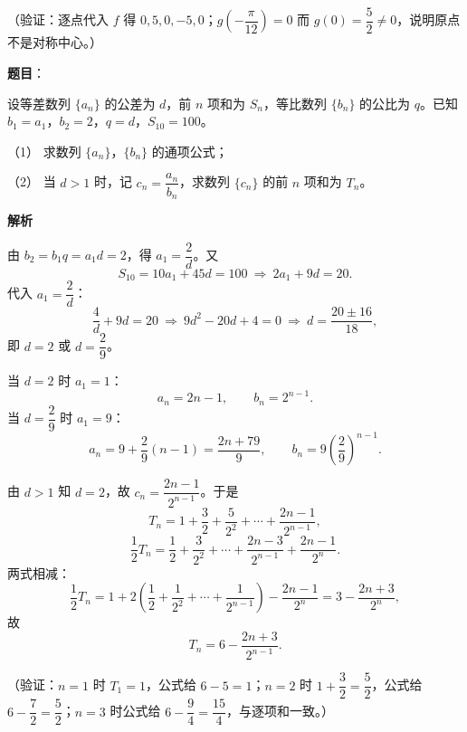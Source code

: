 \begin{answer}
（验证：逐点代入 \(f\) 得 \(0,5,0,-5,0\)；\(g\left(-\dfrac{\pi}{12}\right)=0\) 而 \(g(0)=\dfrac52\neq0\)，说明原点不是对称中心。）



\end{answer}
\begin{answer}

\textbf{题目}：

设等差数列 \(\{a_n\}\) 的公差为 \(d\)，前 \(n\) 项和为 \(S_n\)，等比数列 \(\{b_n\}\) 的公比为 \(q\)。已知 \(b_1=a_1\)，\(b_2=2\)，\(q=d\)，\(S_{10}=100\)。

（1） 求数列 \(\{a_n\}\)，\(\{b_n\}\) 的通项公式；

（2） 当 \(d>1\) 时，记 \(c_n=\dfrac{a_n}{b_n}\)，求数列 \(\{c_n\}\) 的前 \(n\) 项和为 \(T_n\)。

\textbf{解析}


由 \(b_2=b_1q=a_1d=2\)，得 \(a_1=\dfrac2d\)。又
\nopagebreak[4]
\[
S_{10}=10a_1+45d=100
\ \Longrightarrow\ 2a_1+9d=20.
\]
代入 \(a_1=\dfrac2d\)：
\nopagebreak[4]
\[
\frac4d+9d=20
\ \Longrightarrow\ 9d^2-20d+4=0
\ \Longrightarrow\ d=\frac{20\pm16}{18},
\]
即 \(d=2\) 或 \(d=\dfrac29\)。

当 \(d=2\) 时 \(a_1=1\)：
\nopagebreak[4]
\[
a_n=2n-1,\qquad b_n=2^{n-1}.
\]
当 \(d=\dfrac29\) 时 \(a_1=9\)：
\nopagebreak[4]
\[
a_n=9+\frac29(n-1)=\frac{2n+79}{9},\qquad
b_n=9\left(\frac29\right)^{n-1}.
\]


由 \(d>1\) 知 \(d=2\)，故 \(c_n=\dfrac{2n-1}{2^{n-1}}\)。于是
\nopagebreak[4]
\[
T_n=1+\frac3{2}+\frac5{2^2}+\cdots+\frac{2n-1}{2^{n-1}},
\]
\nopagebreak[4]
\[
\frac12T_n=\frac12+\frac3{2^2}+\cdots+\frac{2n-3}{2^{n-1}}+\frac{2n-1}{2^n}.
\]
两式相减：
\nopagebreak[4]
\[
\frac12T_n=1+2\left(\frac12+\frac1{2^2}+\cdots+\frac1{2^{n-1}}\right)-\frac{2n-1}{2^n}
=3-\frac{2n+3}{2^n},
\]
故
\nopagebreak[4]
\[
T_n=6-\frac{2n+3}{2^{n-1}}.
\]

（验证：\(n=1\) 时 \(T_1=1\)，公式给 \(6-5=1\)；\(n=2\) 时 \(1+\dfrac32=\dfrac52\)，公式给 \(6-\dfrac72=\dfrac52\)；\(n=3\) 时公式给 \(6-\dfrac94=\dfrac{15}{4}\)，与逐项和一致。）



\end{answer}
